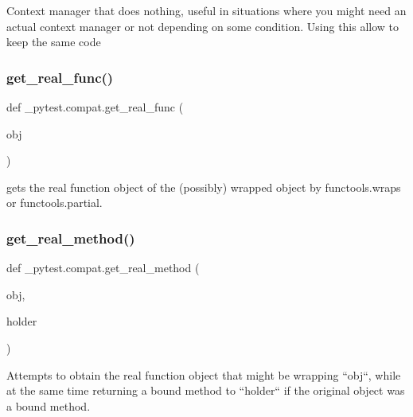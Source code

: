 \begin{DoxyVerb}Context manager that does nothing, useful in situations where you might need an actual context manager or not
depending on some condition. Using this allow to keep the same code\end{DoxyVerb}
 \mbox{\label{namespace__pytest_1_1compat_a72cd14070d89cdcd90692007d8b6d1b0}} 
\subsubsection{\texorpdfstring{get\+\_\+real\+\_\+func()}{get\_real\_func()}}
{\footnotesize\ttfamily def \+\_\+pytest.\+compat.\+get\+\_\+real\+\_\+func (\begin{DoxyParamCaption}\item[{}]{obj }\end{DoxyParamCaption})}

\begin{DoxyVerb}gets the real function object of the (possibly) wrapped object by
functools.wraps or functools.partial.
\end{DoxyVerb}
 \mbox{\label{namespace__pytest_1_1compat_a7cb5efdc829d81e210a6bad6a7ba0a9d}} 
\subsubsection{\texorpdfstring{get\+\_\+real\+\_\+method()}{get\_real\_method()}}
{\footnotesize\ttfamily def \+\_\+pytest.\+compat.\+get\+\_\+real\+\_\+method (\begin{DoxyParamCaption}\item[{}]{obj,  }\item[{}]{holder }\end{DoxyParamCaption})}

\begin{DoxyVerb}Attempts to obtain the real function object that might be wrapping ``obj``, while at the same time
returning a bound method to ``holder`` if the original object was a bound method.
\end{DoxyVerb}
 \mbox{\label{namespace__pytest_1_1compat_adba26e79f738dbde4738a8bf825ddc4e}} 
